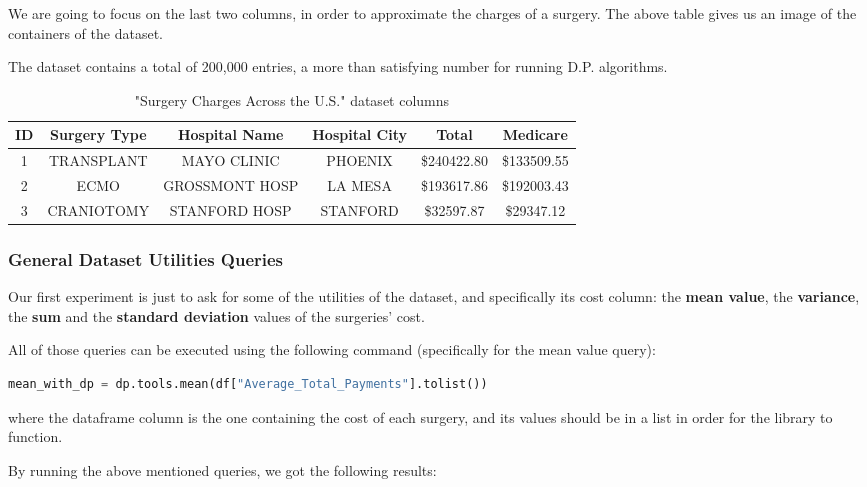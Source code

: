 We are going to focus on the last two columns, in order to approximate the charges of a surgery. The above table gives us an image of the containers of the dataset.

The dataset contains a total of 200,000 entries, a more than satisfying number for running D.P. algorithms.

\begin{table}[!htb]

    \caption{"Surgery Charges Across the U.S." dataset columns}
    \label{numbers}

    \begin{tabular}{| c | c | c | c | c| c |}
      \hline 
      ID & Surgery Type & Hospital Name & Hospital City & Total & Medicare \\
      \hline
      1 & TRANSPLANT & MAYO CLINIC & PHOENIX & \$240422.80 & \$133509.55\\
      \hline
      2 & ECMO &  GROSSMONT HOSP & LA MESA & \$193617.86 & \$192003.43 \\
      \hline
      3 & CRANIOTOMY & STANFORD HOSP &  STANFORD & \$32597.87 & \$29347.12  \\
      \hline
    \end{tabular}

\end{table}

\subsubsection{General Dataset Utilities Queries}

Our first experiment is just to ask for some of the utilities of the dataset, and specifically its cost column: the \textbf{mean value}, the \textbf{variance}, the \textbf{sum} and the \textbf{standard deviation} values of the surgeries' cost. 

All of those queries can be executed using the following command (specifically for the mean value query):
\bigskip

\begin{lstlisting}[language=Python]
mean_with_dp = dp.tools.mean(df["Average_Total_Payments"].tolist())
\end{lstlisting}
\bigskip

where the dataframe column is the one containing the cost of each surgery, and its values should be in a list in order for the library to function.

By running the above mentioned queries, we got the following results:


